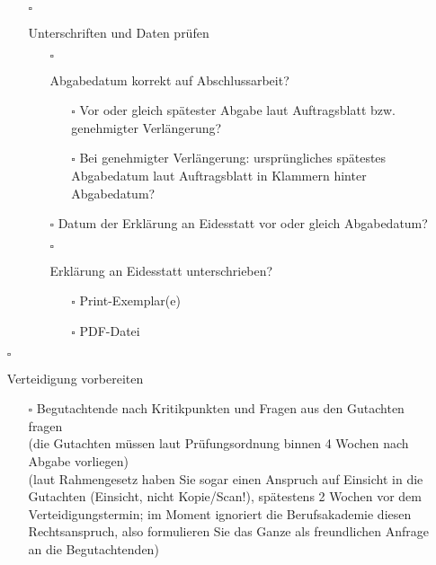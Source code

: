 \begin{itemize}
{\begin{itemize}
{\begin{itemize}
{                    }
                \end{itemize}
            }
            \item[$\square$]{
                Unterschriften und Daten prüfen
                \begin{itemize}
                    \item[$\square$]{
                        Abgabedatum korrekt auf Abschlussarbeit?
                        \begin{itemize}
                            \item[$\square$] Vor oder gleich spätester Abgabe laut Auftragsblatt bzw. genehmigter Verlängerung?
                            \item[$\square$] Bei genehmigter Verlängerung: ursprüngliches spätestes Abgabedatum laut Auftragsblatt in Klammern hinter Abgabedatum?
                        \end{itemize}
                    }
                    \item[$\square$] Datum der Erklärung an Eidesstatt vor oder gleich Abgabedatum?
                    \item[$\square$]{
                        Erklärung an Eidesstatt unterschrieben?
                        \begin{itemize}
                            \item[$\square$] Print-Exemplar(e)
                            \item[$\square$] PDF-Datei
                        \end{itemize}
                    }
                \end{itemize}
            }
        \end{itemize}
    }
    \item[$\square$]{
        Verteidigung vorbereiten
        \begin{itemize}
            \item[$\square$]{
                Begutachtende nach Kritikpunkten und Fragen aus den Gutachten fragen\\
                (die Gutachten müssen laut Prüfungsordnung binnen 4 Wochen nach Abgabe vorliegen)\\
                (laut Rahmengesetz haben Sie sogar einen Anspruch auf Einsicht in die Gutachten (Einsicht, nicht Kopie/Scan!), spätestens 2 Wochen vor dem Verteidigungstermin; im Moment ignoriert die Berufsakademie diesen Rechtsanspruch, also formulieren Sie das Ganze als freundlichen Anfrage an die Begutachtenden)
}
\end{itemize}}
\end{itemize}
